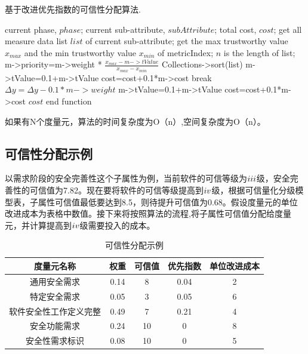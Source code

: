 \begin{algorithm}
	\caption{基于改进优先指数的可信性分配算法.}
	\label{}
	\begin{algorithmic}[1]
		\REQUIRE current phase, $phase$;
		         current sub-attribute, $subAttribute$;
		\ENSURE total cost, $cost$;
		\STATE get all measure data list $list$ of current sub-attribute;
		\STATE get the max trustworthy value $x_{max}$ and the min trustworthy value $x_{min}$ of metricIndex;
		\STATE $n$ is the length of list;
		 \STATE m->priority=m->weight * $\frac{x_{max}-m->tValue}{x_{max}-x_{min}}$
		\ENDFOR
		\STATE Collections->sort(list)
		  \STATE m->tValue=0.1+m->tValue
		  \STATE cost=cost+0.1*m->cost
		  \STATE break
		 \ENDIF
		  \STATE $\Delta y=\Delta y-0.1*m->weight$
		  \STATE m->tValue=0.1+m->tValue
		  \STATE cost=cost+0.1*m->cost
		 \ENDWHILE
		\ENDFOR
		\RETURN $cost$
		\STATE end function
	\end{algorithmic}
\end{algorithm}
  
如果有N个度量元，算法的时间复杂度为O（n）,空间复杂度为O（n）。


\subsection{可信性分配示例\uppercase\expandafter{}}
以需求阶段的安全完善性这个子属性为例，当前软件的可信等级为$\uppercase\expandafter{\romannumeral3}$级，安全完善性的可信值为7.82。现在要将软件的可信等级提高到$\uppercase\expandafter{\romannumeral4}$级，根据可信量化分级模型表，子属性可信值最低要达到8.5，则待提升可信值为0.68。假设度量元的单位改进成本为表格中数值。接下来将按照算法的流程,将子属性可信值分配给度量元，并计算提高到$\uppercase\expandafter{\romannumeral4}$级需要投入的成本。
\begin{table}[!ht]
	\centering
	\renewcommand\arraystretch{1.3}
	\caption{可信性分配示例}
	\begin{tabular}{|c|c|c|c|c|}
		\hline
		\textbf{度量元名称} & \textbf{权重} & \textbf{可信值} & \textbf{优先指数} & \textbf{单位改进成本} \\ 
		\hline
		通用安全需求 & 0.14 & 8 & 0.04 & 2  \\
		\hline
		特定安全需求 & 0.05 & 3 & 0.05 & 6 \\
		\hline
		软件安全性工作定义完整 & 0.49 & 7 & 0.21 & 4\\
		\hline
		安全功能需求  &  0.24 & 10 & 0  &8 \\
		\hline
		安全性需求标识 & 0.08 & 10 & 0 & 5 \\
		\hline
	\end{tabular}
	\label{tab-4-5}
\end{table}

